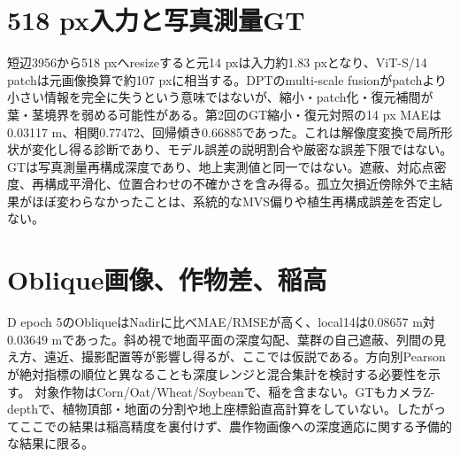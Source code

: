 \section{518 px入力と写真測量GT}
短辺3956から518 pxへresizeすると元14 pxは入力約1.83 pxとなり、ViT-S/14 patchは元画像換算で約107 pxに相当する。DPTのmulti-scale fusionがpatchより小さい情報を完全に失うという意味ではないが、縮小・patch化・復元補間が葉・茎境界を弱める可能性がある。第2回のGT縮小・復元対照の14 px MAEは0.03117 m、相関0.77472、回帰傾き0.66885であった。これは解像度変換で局所形状が変化し得る診断であり、モデル誤差の説明割合や厳密な誤差下限ではない。
GTは写真測量再構成深度であり、地上実測値と同一ではない。遮蔽、対応点密度、再構成平滑化、位置合わせの不確かさを含み得る。孤立欠損近傍除外で主結果がほぼ変わらなかったことは、系統的なMVS偏りや植生再構成誤差を否定しない。
\section{Oblique画像、作物差、稲高}
D epoch 5のObliqueはNadirに比べMAE/RMSEが高く、local14は0.08657 m対0.03649 mであった。斜め視で地面平面の深度勾配、葉群の自己遮蔽、列間の見え方、遠近、撮影配置等が影響し得るが、ここでは仮説である。方向別Pearsonが絶対指標の順位と異なることも深度レンジと混合集計を検討する必要性を示す。
対象作物はCorn/Oat/Wheat/Soybeanで、稲を含まない。GTもカメラZ-depthで、植物頂部・地面の分割や地上座標鉛直高計算をしていない。したがってここでの結果は稲高精度を裏付けず、農作物画像への深度適応に関する予備的な結果に限る。
